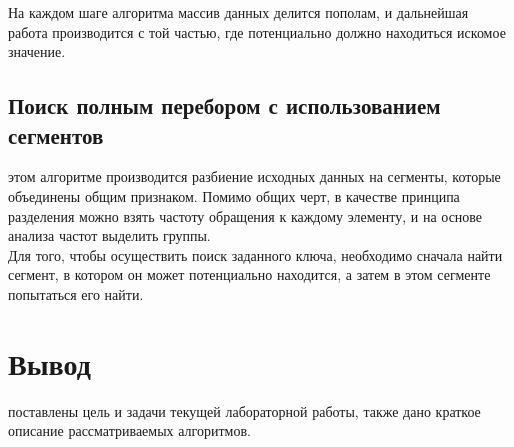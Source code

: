 На каждом шаге алгоритма массив данных делится пополам, и дальнейшая работа производится с той частью, где потенциально должно находиться искомое значение. \cite{Tardos}

\subsection{Поиск полным перебором с использованием сегментов}
 этом алгоритме производится разбиение исходных данных на сегменты, которые объединены общим признаком. Помимо общих черт, в качестве принципа разделения можно взять частоту обращения к каждому элементу, и на основе анализа частот выделить группы.\\

Для того, чтобы осуществить поиск заданного ключа, необходимо сначала найти сегмент, в котором он может потенциально находится, а затем в этом сегменте попытаться его найти. 

\section*{Вывод}
 поставлены цель и задачи текущей лабораторной работы, также дано краткое описание рассматриваемых алгоритмов.